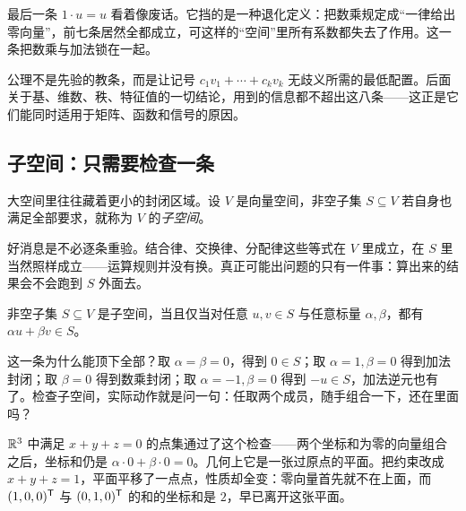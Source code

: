 最后一条 \(1\cdot u=u\) 看着像废话。它挡的是一种退化定义：把数乘规定成``一律给出零向量''，前七条居然全都成立，可这样的``空间''里所有系数都失去了作用。这一条把数乘与加法锁在一起。

\begin{remark}
公理不是先验的教条，而是让记号 \(c_1v_1+\cdots+c_kv_k\) 无歧义所需的最低配置。后面关于基、维数、秩、特征值的一切结论，用到的信息都不超出这八条——这正是它们能同时适用于矩阵、函数和信号的原因。
\end{remark}

\subsection{子空间：只需要检查一条}

大空间里往往藏着更小的封闭区域。设 \(V\) 是向量空间，非空子集 \(S\subseteq V\) 若自身也满足全部要求，就称为 \(V\) 的\emph{子空间}。

好消息是不必逐条重验。结合律、交换律、分配律这些等式在 \(V\) 里成立，在 \(S\) 里当然照样成立——运算规则并没有换。真正可能出问题的只有一件事：算出来的结果会不会跑到 \(S\) 外面去。

\begin{proposition}
非空子集 \(S\subseteq V\) 是子空间，当且仅当对任意 \(u,v\in S\) 与任意标量 \(\alpha,\beta\)，都有 \(\alpha u+\beta v\in S\)。
\end{proposition}

这一条为什么能顶下全部？取 \(\alpha=\beta=0\)，得到 \(0\in S\)；取 \(\alpha=1,\beta=0\) 得到加法封闭；取 \(\beta=0\) 得到数乘封闭；取 \(\alpha=-1,\beta=0\) 得到 \(-u\in S\)，加法逆元也有了。检查子空间，实际动作就是问一句：任取两个成员，随手组合一下，还在里面吗？

\(\mathbb{R}^3\) 中满足 \(x+y+z=0\) 的点集通过了这个检查——两个坐标和为零的向量组合之后，坐标和仍是 \(\alpha\cdot0+\beta\cdot0=0\)。几何上它是一张过原点的平面。把约束改成 \(x+y+z=1\)，平面平移了一点点，性质却全变：零向量首先就不在上面，而 \((1,0,0)^{\mathsf{T}}\) 与 \((0,1,0)^{\mathsf{T}}\) 的和的坐标和是 \(2\)，早已离开这张平面。

